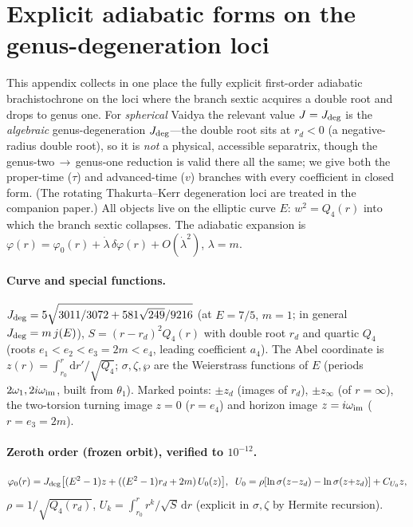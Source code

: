 \documentclass[12pt]{iopart}
\newcommand{\Jc}{J_{\rm deg}}
\newcommand{\dd}{\mathrm{d}}
\begin{document}
\section{Explicit adiabatic forms on the genus-degeneration loci}
\label{app:separatrix}
This appendix collects in one place the fully explicit first-order adiabatic
brachistochrone on the loci where the branch sextic acquires a double root and drops to
genus one. For \emph{spherical} Vaidya the relevant value $J=\Jc$ is the \emph{algebraic}
genus-degeneration $J_{\rm deg}$---the double root sits at $r_d<0$
(a negative-radius double root), so it is \emph{not} a physical, accessible separatrix,
though the genus-two$\,\to\,$genus-one reduction is valid there all the same; we give both
the proper-time ($\tau$) and advanced-time ($v$) branches with every coefficient in closed
form. (The rotating Thakurta--Kerr degeneration loci are treated in the companion paper.) All objects live on
the elliptic curve $E:\,w^2=Q_4(r)$ into which the branch sextic collapses. The adiabatic expansion is
$\varphi(r)=\varphi_0(r)+\dot\lambda\,\delta\varphi(r)+O(\dot\lambda^2)$, $\lambda=m$.

\paragraph{Curve and special functions.}
$\Jc=5\sqrt{3011/3072+581\sqrt{249}/9216}$ (at $E=7/5,\,m=1$; in general $\Jc=m\,j(E)$),
$S=(r-r_d)^2Q_4(r)$ with double root $r_d$ and quartic $Q_4$ (roots
$e_1<e_2<e_3=2m<e_4$, leading coefficient $a_4$). The Abel coordinate is
$z(r)=\int_{r_0}^r\dd r'/\sqrt{Q_4}$; $\sigma,\zeta,\wp$ are the Weierstrass functions
of $E$ (periods $2\omega_1,2i\omega_{\rm im}$, built from $\theta_1$). Marked points:
$\pm z_d$ (images of $r_d$), $\pm z_\infty$ (of $r=\infty$), the two-torsion turning
image $z=0$ ($r=e_4$) and horizon image $z=i\omega_{\rm im}$ ($r=e_3=2m$).

\paragraph{Zeroth order (frozen orbit), verified to $10^{-12}$.}
\begin{equation}
\varphi_0(r)=\Jc\big[(E^2-1)z+((E^2-1)r_d+2m)\,U_0(z)\big],\;\;
U_0=\rho[\ln\sigma(z{-}z_d)-\ln\sigma(z{+}z_d)]+C_{U_0}z,
\end{equation}
$\rho=1/\sqrt{Q_4(r_d)}$, $U_k=\int_{r_0}^r r^k/\sqrt S\,\dd r$ (explicit in
$\sigma,\zeta$ by Hermite recursion).
\end{document}
